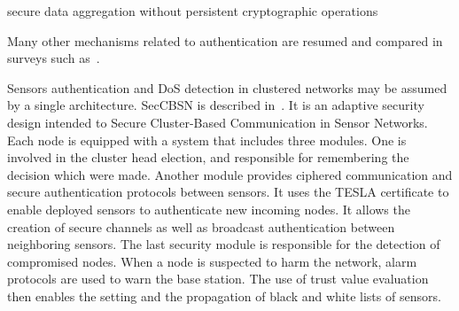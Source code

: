 secure data aggregation without persistent cryptographic operations\cite{WDSX07}

Many other mechanisms related to authentication are resumed and compared in surveys such as~\cite{SOBMCN11}.





Sensors authentication and DoS detection in clustered networks may be assumed by a single architecture.
SecCBSN is described in~\cite{HHC07}.
It is an adaptive security design intended to Secure Cluster-Based Communication in Sensor Networks.
Each node is equipped with a system that includes three modules.
One is involved in the cluster head election, and responsible for remembering the decision which were made.
Another module provides ciphered communication and secure authentication protocols between sensors.
It uses the TESLA certificate to enable deployed sensors to authenticate new incoming nodes.
It allows the creation of secure channels as well as broadcast authentication between neighboring sensors.
The last security module is responsible for the detection of compromised nodes.
When a node is suspected to harm the network, alarm protocols are used to warn the base station.
The use of trust value evaluation then enables the setting and the propagation of black and white lists of sensors.



